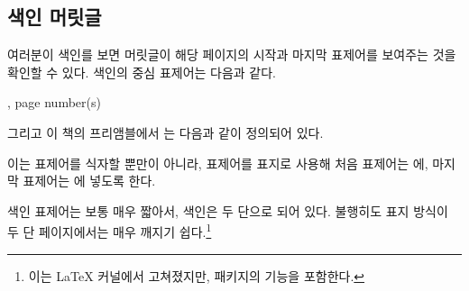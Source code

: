 


\subsection{색인 머릿글}


여러분이 색인를 보면 머릿글이 해당
페이지의 시작과 마지막 표제어를 보여주는 것을 확인할 수 있다.
색인의 중심 표제어는 다음과 같다.
\begin{lcode}
\item {}, page number(s)
\end{lcode}
그리고 이 책의 프리앰블에서 \cmd{\idxmark}는 다음과
같이 정의되어 있다.
\begin{lcode}
\newcommand{\idxmark}[1]{#1\markboth{#1}{#1}}
\end{lcode}
이는 표제어를 식자할 뿐만이 아니라, 표제어를 표지로 사용해 처음 표제어는
\cmd{\rightmark}에, 마지막 표제어는 \cmd{\leftmark}에 넣도록 한다.

색인 표제어는 보통 매우 짧아서, 색인은 두
단으로 되어 있다.
불행히도  표지 방식이 두 단 페이지에서는 매우 깨지기
쉽다.\footnote{이는 \LaTeX{} 커널에서 고쳐졌지만,  패키지의
기능을 포함한다.}

